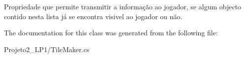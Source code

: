 Propriedade que permite transmitir a informação ao jogador, se algum objecto contido nesta lista já se encontra visivel ao jogador ou não. 



The documentation for this class was generated from the following file\+:\begin{DoxyCompactItemize}
\item 
Projeto2\+\_\+\+L\+P1/Tile\+Maker.\+cs\end{DoxyCompactItemize}
